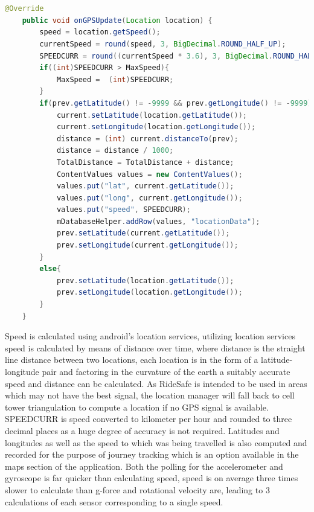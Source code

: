  \begin{lstlisting}[language=Java,basicstyle=\small, breaklines=true, label={lst:labell},caption={Calculating Speed \& Distance}]


@Override
    public void onGPSUpdate(Location location) {
        speed = location.getSpeed();
        currentSpeed = round(speed, 3, BigDecimal.ROUND_HALF_UP);
        SPEEDCURR = round((currentSpeed * 3.6), 3, BigDecimal.ROUND_HALF_UP);
        if((int)SPEEDCURR > MaxSpeed){
            MaxSpeed =  (int)SPEEDCURR;
        }
        if(prev.getLatitude() != -9999 && prev.getLongitude() != -9999){
            current.setLatitude(location.getLatitude());
            current.setLongitude(location.getLongitude());
            distance = (int) current.distanceTo(prev);
            distance = distance / 1000;
            TotalDistance = TotalDistance + distance;
            ContentValues values = new ContentValues();
            values.put("lat", current.getLatitude());
            values.put("long", current.getLongitude());
            values.put("speed", SPEEDCURR);
            mDatabaseHelper.addRow(values, "locationData");
            prev.setLatitude(current.getLatitude());
            prev.setLongitude(current.getLongitude());
        }
        else{
            prev.setLatitude(location.getLatitude());
            prev.setLongitude(location.getLongitude());
        }
    }

\end{lstlisting}


Speed is calculated using android's location services, utilizing location services speed is calculated by means of distance over time, where distance is the straight line distance between two locations, each location is in the form of a latitude-longitude pair and factoring in the curvature of the earth a suitably accurate speed and distance can be calculated. As RideSafe is intended to be used in areas which may not have the best signal, the location manager will fall back to cell tower triangulation to compute a location if no GPS signal is available. SPEEDCURR is speed converted to kilometer per hour and rounded to three decimal places as a huge degree of accuracy is not required. Latitudes and longitudes as well as the speed to which was being travelled is also computed and recorded for the purpose of journey tracking which is an option available in the maps section of the application. Both the polling for the  accelerometer and gyroscope is far quicker than calculating speed, speed is on average three times slower to calculate than g-force and rotational velocity are, leading to 3 calculations of each sensor corresponding to a single speed.       


